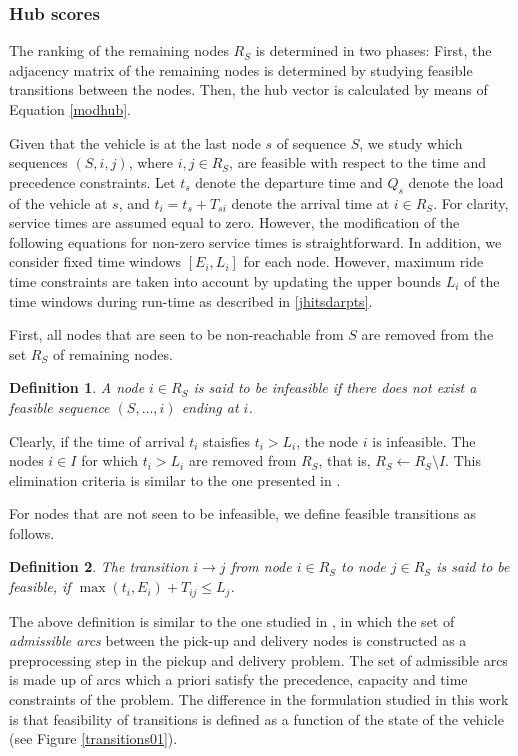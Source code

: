 \documentclass[dissertation,draft*]{aaltoseries}
\newtheorem*{definition}{Definition}
\begin{document}
\subsubsection{Hub scores}
\label{feasibility}
The ranking of the remaining nodes $R_S$ is determined in two phases: 
First, the adjacency matrix of the remaining nodes is determined by studying 
feasible transitions between the nodes.
Then, the hub vector is calculated by means of Equation \eqref{modhub}.

Given that the vehicle is at the last node $s$ of sequence $S$, we study which sequences $(S,i,j)$, where 
$i,j \in R_S$, are feasible with respect to the time and precedence constraints. %
Let $t_s$ denote the departure time and $Q_s$ denote the load of the vehicle at $s$, 
and $t_i = t_s + T_{si}$ denote the arrival time at $i \in R_S$. For clarity, service times are 
assumed equal to zero. However, the modification
of the following equations for non-zero service times is straightforward.
In addition, we consider %
fixed time windows $[E_i,L_i]$ for each node.
However, maximum ride time constraints \cite{hunsaker} are taken into account by updating the 
upper bounds $L_i$ of the time windows during run-time as described in \ref{jhitsdarpts}.

First, all nodes that are seen to be non-reachable from $S$ are removed from the set $R_S$ of remaining nodes.
\begin{definition}
 \label{linkki02}
A node $i \in R_S$ is said to be infeasible if
there does not exist a feasible sequence $(S,\ldots,i)$ ending at $i$.
\end{definition}
Clearly, if the time of arrival $t_i$ staisfies $t_i > L_i$, the node $i$ is infeasible.
The nodes $i \in I$ for which $t_i > L_i$ are removed from $R_S$, 
that is, $R_S \leftarrow R_S \setminus I$. This elimination criteria is similar to 
the one presented in \cite{desrosiers01}.

For nodes that are not seen to be infeasible, we define feasible transitions as follows.
\begin{definition}
\label{feasibletransitions}
The transition 
$i \to j$ from node $i \in R_S$ to node $j \in R_S$ is said to be \emph{feasible}, if 
$\max(t_i, E_i) + T_{ij} \leq L_j$. 
\end{definition}
The above definition is similar to the one studied in \cite{dumas03}, 
in which the set of \emph{admissible arcs} between the pick-up and delivery nodes is constructed
as a preprocessing step in the pickup and delivery problem. The set of admissible arcs is 
made up of arcs which a priori satisfy the precedence, capacity and time constraints of the problem.
The difference in the formulation studied in this work is that feasibility of 
transitions is defined as a function of the state of the vehicle (see Figure \ref{transitions01}).
\end{document}
